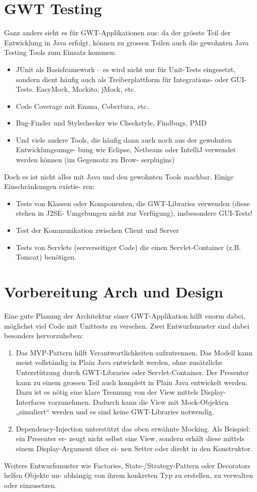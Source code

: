 \documentclass[a4paper,10pt]{scrreprt}
\begin{document}
\section{GWT Testing}
Ganz anders sieht es für GWT-Applikationen aus: da der grösste Teil der Entwicklung in Java erfolgt,
können zu grossen Teilen auch die gewohnten Java Testing Tools zum Einsatz kommen:
\begin{itemize}
 \item JUnit als Basisframework – es wird nicht nur für Unit-Tests eingesetzt, sondern dient häufig
auch als Treiberplattform für Integrations- oder GUI-Tests.
EasyMock, Mockito, jMock, etc.
\item Code Coverage mit Emma, Cobertura, etc.
\item Bug-Finder und Stylechecker wie Checkstyle, Findbugs, PMD
\item Und viele andere Tools, die häufig dann auch noch aus der gewohnten Entwicklungsumge-
bung wie Eclipse, Netbeans oder IntelliJ verwendet werden können (im Gegensatz zu Brow-
serplugins)
\end{itemize}
Doch es ist nicht alles mit Java und den gewohnten Tools machbar. Einige Einschränkungen existie-
ren:
\begin{itemize}
 \item Tests von Klassen oder Komponenten, die GWT-Libraries verwenden (diese stehen in J2SE-
Umgebungen nicht zur Verfügung), insbesondere GUI-Tests!
\item Test der Kommunikation zwischen Client und Server
\item Tests von Servlets (serverseitiger Code) die einen Servlet-Container (z.B. Tomcat) benötigen.
\end{itemize}

\section{Vorbereitung Arch und Design}
Eine gute Planung der Architektur einer GWT-Applikation hilft enorm dabei, möglichst viel Code mit
Unittests zu versehen. Zwei Entwurfsmuster sind dabei besonders hervorzuheben:

\begin{enumerate}
\item Das MVP-Pattern hilft Verantwortlichkeiten aufzutrennen. Das Modell kann meist vollständig
in Plain Java entwickelt werden, ohne zusätzliche Unterstützung durch GWT-Libraries oder
Servlet-Container. Der Presenter kann zu einem grossen Teil auch komplett in Plain Java
entwickelt werden. Dazu ist es nötig eine klare Trennung von der View mittels Display-
Interfaces vorzunehmen. Dadurch kann die View mit Mock-Objekten „simuliert“ werden und
es sind keine GWT-Libraries notwendig.
\item Dependency-Injection unterstützt das oben erwähnte Mocking. Als Beispiel: ein Presenter er-
zeugt nicht selbst eine View, sondern erhält diese mittels einem Display-Argument über ei-
nen Setter oder direkt in den Konstruktor.
\end{enumerate}
Weitere Entwurfsmuster wie Factories, State-/Strategy-Pattern oder Decorators helfen Objekte un-
abhängig von ihrem konkreten Typ zu erstellen, zu verwalten oder einzusetzen.
\end{document}
